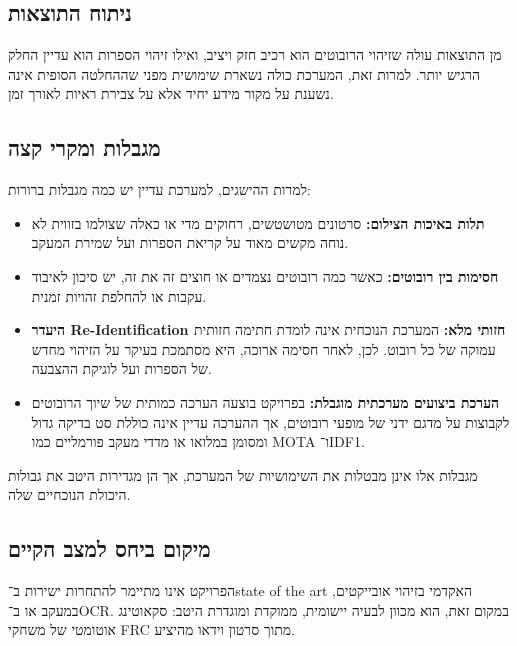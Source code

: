 \subsection{ניתוח התוצאות}

מן התוצאות עולה שזיהוי הרובוטים הוא רכיב חזק ויציב, ואילו זיהוי
הספרות הוא עדיין החלק הרגיש יותר. למרות זאת, המערכת כולה נשארת שימושית
מפני שההחלטה הסופית אינה נשענת על מקור מידע יחיד אלא על צבירת ראיות
לאורך זמן.

\subsection{מגבלות ומקרי קצה}

למרות ההישגים, למערכת עדיין יש כמה מגבלות ברורות:

\begin{itemize}

\item \textbf{תלות באיכות הצילום:} סרטונים מטושטשים, רחוקים מדי או
  כאלה שצולמו בזווית לא נוחה מקשים מאוד על קריאת הספרות ועל שמירת
  המעקב.

\item \textbf{חסימות בין רובוטים:} כאשר כמה רובוטים נצמדים או חוצים זה
  את זה, יש סיכון לאיבוד עקבות או להחלפת זהויות זמנית.

\item \textbf{היעדר \textenglish{Re-Identification} חזותי מלא:} המערכת
  הנוכחית אינה לומדת חתימה חזותית עמוקה של כל רובוט. לכן, לאחר חסימה
  ארוכה, היא מסתמכת בעיקר על הזיהוי מחדש של הספרות ועל לוגיקת ההצבעה.

\item \textbf{הערכת ביצועים מערכתית מוגבלת:} בפרויקט בוצעה הערכה
  כמותית של שיוך הרובוטים לקבוצות על מדגם ידני של מופעי רובוטים, אך
  ההערכה עדיין אינה כוללת סט בדיקה גדול ומסומן במלואו או מדדי מעקב
  פורמליים כמו \textenglish{MOTA} ו־\textenglish{IDF1}.

\end{itemize}

מגבלות אלו אינן מבטלות את השימושיות של המערכת, אך הן מגדירות היטב את
גבולות היכולת הנוכחיים שלה.

\subsection{מיקום ביחס למצב הקיים}

הפרויקט אינו מתיימר להתחרות ישירות ב־\textenglish{state of the art}
האקדמי בזיהוי אובייקטים, במעקב או ב־\textenglish{OCR}. במקום זאת, הוא
מכוון לבעיה יישומית, ממוקדת ומוגדרת היטב: סקאוטינג אוטומטי של משחקי
\textenglish{FRC} מתוך סרטון וידאו מהיציע.

